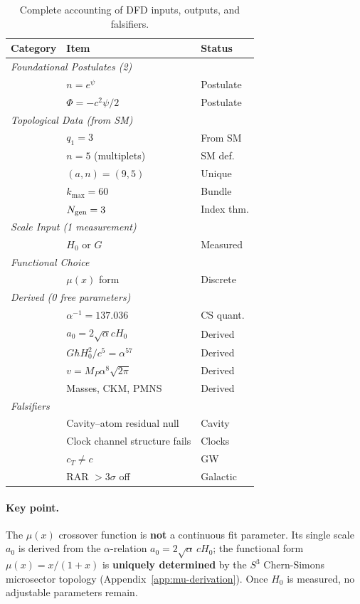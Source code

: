 \begin{table}[h]
\centering
\caption{Complete accounting of DFD inputs, outputs, and falsifiers.}\label{tab:dof_ledger}
\begin{ruledtabular}
\scriptsize
\begin{tabular}{lll}
\textbf{Category} & \textbf{Item} & \textbf{Status} \\
\hline
\multicolumn{3}{l}{\textit{Foundational Postulates (2)}} \\
& $n = e^\psi$ & Postulate \\
& $\Phi = -c^2\psi/2$ & Postulate \\
\hline
\multicolumn{3}{l}{\textit{Topological Data (from SM)}} \\
& $q_1 = 3$ & From SM \\
& $n = 5$ (multiplets) & SM def. \\
& $(a,n) = (9,5)$ & Unique \\
& $k_{\max} = 60$ & Bundle \\
& $N_{\rm gen} = 3$ & Index thm. \\
\hline
\multicolumn{3}{l}{\textit{Scale Input (1 measurement)}} \\
& $H_0$ or $G$ & Measured \\
\hline
\multicolumn{3}{l}{\textit{Functional Choice}} \\
& $\mu(x)$ form & Discrete \\
\hline
\multicolumn{3}{l}{\textit{Derived (0 free parameters)}} \\
& $\alpha^{-1} = 137.036$ & CS quant. \\
& $a_0 = 2\sqrt{\alpha}cH_0$ & Derived \\
& $G\hbar H_0^2/c^5 = \alpha^{57}$ & Derived \\
& $v = M_P\alpha^8\sqrt{2\pi}$ & Derived \\
& Masses, CKM, PMNS & Derived \\
\hline
\multicolumn{3}{l}{\textit{Falsifiers}} \\
& Cavity--atom residual null & Cavity \\
& Clock channel structure fails & Clocks \\
& $c_T \neq c$ & GW \\
& RAR $>3\sigma$ off & Galactic \\
\end{tabular}
\end{ruledtabular}
\end{table}

\paragraph{Key point.}
The $\mu(x)$ crossover function is \textbf{not} a continuous fit parameter. Its single scale $a_0$ is derived from the $\alpha$-relation $a_0 = 2\sqrt{\alpha}\,cH_0$; the functional form $\mu(x) = x/(1+x)$ is \textbf{uniquely determined} by the $S^3$ Chern-Simons microsector topology (Appendix~\ref{app:mu-derivation}). Once $H_0$ is measured, no adjustable parameters remain.

